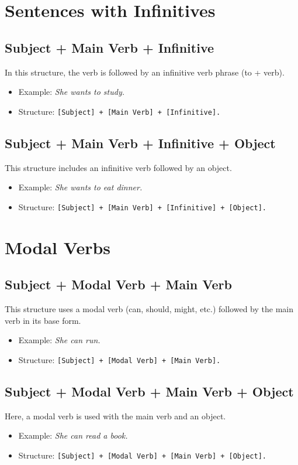 \documentclass{book}
\begin{document}
\section{Sentences with Infinitives}

\subsection{Subject + Main Verb + Infinitive}
In this structure, the verb is followed by an infinitive verb phrase (to + verb).
\begin{itemize}
	\item Example: \textit{She wants to study.}
	\item Structure: \texttt{[Subject] + [Main Verb] + [Infinitive].}
\end{itemize}

\subsection{Subject + Main Verb + Infinitive + Object}
This structure includes an infinitive verb followed by an object.
\begin{itemize}
	\item Example: \textit{She wants to eat dinner.}
	\item Structure: \texttt{[Subject] + [Main Verb] + [Infinitive] + [Object].}
\end{itemize}

\section{Modal Verbs}

\subsection{Subject + Modal Verb + Main Verb}
This structure uses a modal verb (can, should, might, etc.) followed by the main verb in its base form.
\begin{itemize}
	\item Example: \textit{She can run.}
	\item Structure: \texttt{[Subject] + [Modal Verb] + [Main Verb].}
\end{itemize}

\subsection{Subject + Modal Verb + Main Verb + Object}
Here, a modal verb is used with the main verb and an object.
\begin{itemize}
	\item Example: \textit{She can read a book.}
	\item Structure: \texttt{[Subject] + [Modal Verb] + [Main Verb] + [Object].}
\end{itemize}
\end{document}
